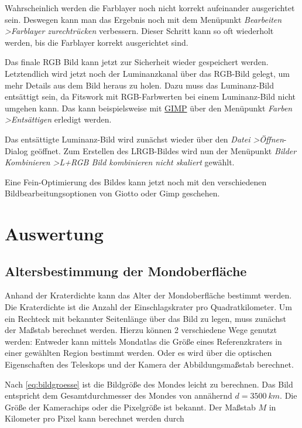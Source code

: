 \documentclass[10pt,a4paper,titlepage]{article}
\begin{document}
Wahrscheinlich werden die Farblayer noch nicht korrekt aufeinander ausgerichtet sein. Deswegen kann man das Ergebnis noch mit dem Menüpunkt \textit{Bearbeiten \textgreater Farblayer zurechtrücken} verbessern. Dieser Schritt kann so oft wiederholt werden, bis die Farblayer korrekt ausgerichtet sind.

Das finale RGB Bild kann jetzt zur Sicherheit wieder gespeichert werden. Letztendlich wird jetzt noch der Luminanzkanal über das RGB-Bild gelegt, um mehr Details aus dem Bild heraus zu holen. Dazu muss das Luminanz-Bild entsättigt sein, da Fitswork mit RGB-Farbwerten bei einem Luminanz-Bild nicht umgehen kann. Das kann beispielsweise mit \href{http://gimp.org}{GIMP} über den Menüpunkt \textit{Farben \textgreater Entsättigen} erledigt werden.

Das entsättigte Luminanz-Bild wird zunächst wieder über den \textit{Datei \textgreater Öffnen}-Dialog geöffnet. Zum Erstellen des LRGB-Bildes wird nun der Menüpunkt \textit{Bilder Kombinieren \textgreater L+RGB Bild kombinieren nicht skaliert} gewählt.

Eine Fein-Optimierung des Bildes kann jetzt noch mit den verschiedenen Bildbearbeitungsoptionen von Giotto oder Gimp geschehen.

\section{Auswertung}
\subsection{Altersbestimmung der Mondoberfläche}

Anhand der Kraterdichte kann das Alter der Mondoberfläche bestimmt werden. Die Kraterdichte ist die Anzahl der Einschlagskrater pro Quadratkilometer. Um ein Rechteck mit bekannter Seitenlänge über das Bild zu legen, muss zunächst der Maßstab berechnet werden. Hierzu können 2 verschiedene Wege genutzt werden: Entweder kann mittels Mondatlas die Größe eines Referenzkraters in einer gewählten Region bestimmt werden. Oder es wird über die optischen Eigenschaften des Teleskops und der Kamera der Abbildungsmaßstab berechnet.

Nach \ref{eq:bildgroesse} ist die Bildgröße des Mondes leicht zu berechnen. Das Bild entspricht dem Gesamtdurchmesser des Mondes von annähernd $d = \SI{3500}{km}$. Die Größe der Kamerachips oder die Pixelgröße ist bekannt. Der Maßstab $M$ in Kilometer pro Pixel kann berechnet werden durch
\end{document}
